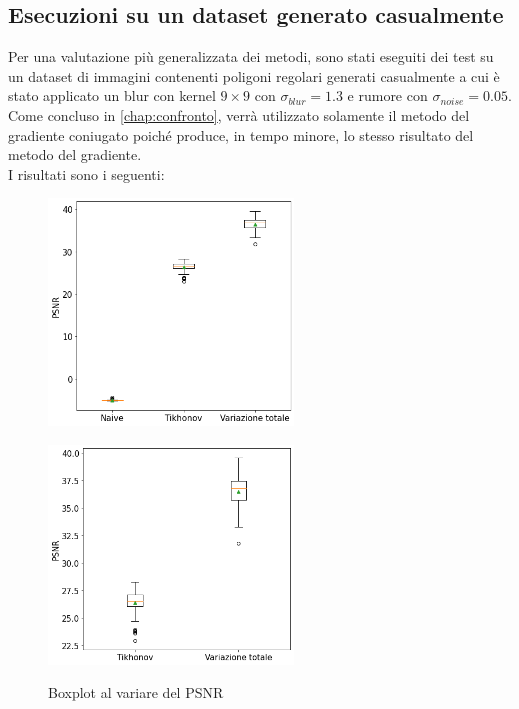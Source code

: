 \documentclass[11pt]{article}
\begin{document}
\subsection{Esecuzioni su un dataset generato casualmente}
Per una valutazione più generalizzata dei metodi, sono stati eseguiti dei test su un dataset di immagini contenenti poligoni regolari generati casualmente 
a cui è stato applicato un blur con kernel $9 \times 9$ con $\sigma_{blur}=1.3$ e rumore con $\sigma_{noise}=0.05$.\\
Come concluso in \autoref{chap:confronto}, verrà utilizzato solamente il metodo del gradiente coniugato poiché produce, in tempo minore, lo stesso risultato del metodo del gradiente.\\
I risultati sono i seguenti:
\begin{figure}[H]
    \centering
    \begin{minipage}{0.45\textwidth}
        \centering
        \includegraphics[width=6.5cm]{esecuzioni_multiple/100/psnr1.png}
        \label{fig:100_psnr1}
    \end{minipage}\hfill
    \begin{minipage}{0.45\textwidth}
        \centering
        \includegraphics[width=6.5cm]{esecuzioni_multiple/100/psnr2.png}
        \label{fig:100_psnr2}
    \end{minipage}
    \caption{Boxplot al variare del PSNR}
\end{figure}
\end{document}
